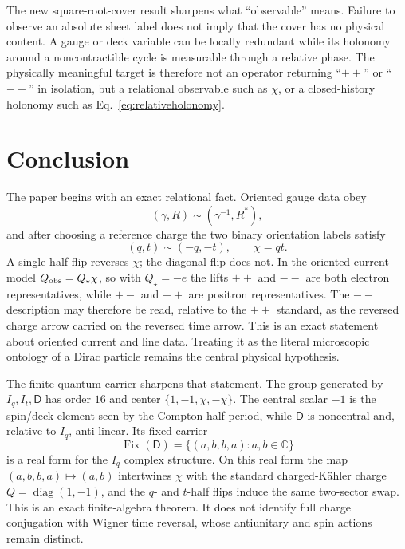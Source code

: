 \documentclass[11pt]{article}
\theoremstyle{definition}\newtheorem{definition}[theorem]{Definition}
\theoremstyle{remark}\newtheorem{remark}[theorem]{Remark}\newtheorem{conjecture}[theorem]{Conjecture}
\begin{document}
The new square-root-cover result sharpens what ``observable'' means. Failure to observe an absolute sheet label does not imply that the cover has no physical content. A gauge or deck variable can be locally redundant while its holonomy around a noncontractible cycle is measurable through a relative phase. The physically meaningful target is therefore not an operator returning ``$++$'' or ``$--$'' in isolation, but a relational observable such as $\chi$, or a closed-history holonomy such as Eq.~\eqref{eq:relativeholonomy}.

\section{Conclusion}
The paper begins with an exact relational fact. Oriented gauge data obey
\begin{equation}
 (\gamma,R)\sim(\gamma^{-1},R^*),
\end{equation}
and after choosing a reference charge the two binary orientation labels satisfy
\begin{equation}
 \boxed{(q,t)\sim(-q,-t),\qquad \chi=qt.}
\end{equation}
A single half flip reverses $\chi$; the diagonal flip does not. In the oriented-current model $Q_{\rm obs}=Q_\star\chi$, so with $Q_\star=-e$ the lifts $++$ and $--$ are both electron representatives, while $+-$ and $-+$ are positron representatives. The $--$ description may therefore be read, relative to the $++$ standard, as the reversed charge arrow carried on the reversed time arrow. This is an exact statement about oriented current and line data. Treating it as the literal microscopic ontology of a Dirac particle remains the central physical hypothesis.

The finite quantum carrier sharpens that statement. The group generated by $I_q,I_t,\mathsf D$ has order $16$ and center $\{1,-1,\chi,-\chi\}$. The central scalar $-1$ is the spin/deck element seen by the Compton half-period, while $\mathsf D$ is noncentral and, relative to $I_q$, anti-linear. Its fixed carrier
\begin{equation}
 \operatorname{Fix}(\mathsf D)=\{(a,b,b,a):a,b\in\mathbb C\}
\end{equation}
is a real form for the $I_q$ complex structure. On this real form the map $(a,b,b,a)\mapsto(a,b)$ intertwines $\chi$ with the standard charged-K\"ahler charge $Q=\operatorname{diag}(1,-1)$, and the $q$- and $t$-half flips induce the same two-sector swap. This is an exact finite-algebra theorem. It does not identify full charge conjugation with Wigner time reversal, whose antiunitary and spin actions remain distinct.
\end{document}
